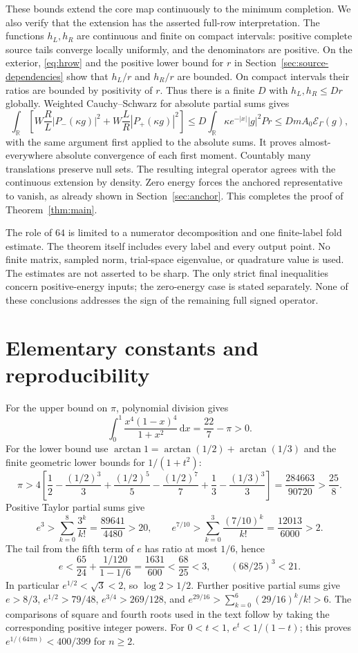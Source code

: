 \documentclass[11pt]{article}
\theoremstyle{remark}\newtheorem{remark}[theorem]{Remark}
\newcommand{\R}{\mathbb R}
\newcommand{\E}{\mathcal E}
\newcommand{\dd}{\,\mathrm d}
\numberwithin{equation}{section}
\begin{document}
These bounds extend the core map continuously to the minimum completion. We also verify that the extension has the asserted full-row interpretation. The functions $h_L,h_R$ are continuous and finite on compact intervals: positive complete source tails converge locally uniformly, and the denominators are positive. On the exterior, \eqref{eq:hrow} and the positive lower bound for $r$ in Section~\ref{sec:source-dependencies} show that $h_L/r$ and $h_R/r$ are bounded. On compact intervals their ratios are bounded by positivity of $r$. Thus there is a finite $D$ with $h_L,h_R\le Dr$ globally. Weighted Cauchy--Schwarz for absolute partial sums gives
\[
 \int_\R\left[W\frac RL|P_-(\kappa g)|^2
                   +W\frac LR|P_+(\kappa g)|^2\right]
 \le D\int_\R\kappa e^{-|x|}|g|^2Pr
 \le DmA_0\E_\Gamma(g),
\]
with the same argument first applied to the absolute sums. It proves almost-everywhere absolute convergence of each first moment. Countably many translations preserve null sets. The resulting integral operator agrees with the continuous extension by density. Zero energy forces the anchored representative to vanish, as already shown in Section~\ref{sec:anchor}. This completes the proof of Theorem~\ref{thm:main}.

The role of $64$ is limited to a numerator decomposition and one finite-label fold estimate. The theorem itself includes every label and every output point. No finite matrix, sampled norm, trial-space eigenvalue, or quadrature value is used. The estimates are not asserted to be sharp. The only strict final inequalities concern positive-energy inputs; the zero-energy case is stated separately. None of these conclusions addresses the sign of the remaining full signed operator.

\appendix
\section{Elementary constants and reproducibility}\label{app:scalar}
For the upper bound on $\pi$, polynomial division gives
\[
 \int_0^1\frac{x^4(1-x)^4}{1+x^2}\dd x=\frac{22}{7}-\pi>0.
\]
For the lower bound use $\arctan1=\arctan(1/2)+\arctan(1/3)$ and the finite geometric lower bounds for $1/(1+t^2)$:
\[
 \pi>4\left[\frac12-\frac{(1/2)^3}{3}+\frac{(1/2)^5}{5}
 -\frac{(1/2)^7}{7}+\frac13-\frac{(1/3)^3}{3}\right]
 =\frac{284663}{90720}>\frac{25}{8}.
\]
Positive Taylor partial sums give
\[
 e^3>\sum_{k=0}^{8}\frac{3^k}{k!}=\frac{89641}{4480}>20,
 \qquad e^{7/10}>\sum_{k=0}^{3}\frac{(7/10)^k}{k!}
 =\frac{12013}{6000}>2.
\]
The tail from the fifth term of $e$ has ratio at most $1/6$, hence
\[
 e<\frac{65}{24}+\frac{1/120}{1-1/6}
 =\frac{1631}{600}<\frac{68}{25}<3,
 \qquad (68/25)^3<21.
\]
In particular $e^{1/2}<\sqrt3<2$, so $\log2>1/2$.
Further positive partial sums give $e>8/3$,
$e^{1/2}>79/48$, $e^{3/4}>269/128$, and
$e^{29/16}>\sum_{k=0}^6(29/16)^k/k!>6$.
The comparisons of square and fourth roots used in the text follow by taking the corresponding positive integer powers. For $0<t<1$,
$e^t<1/(1-t)$; this proves $e^{1/(64\pi n)}<400/399$ for $n\ge2$.
\end{document}
